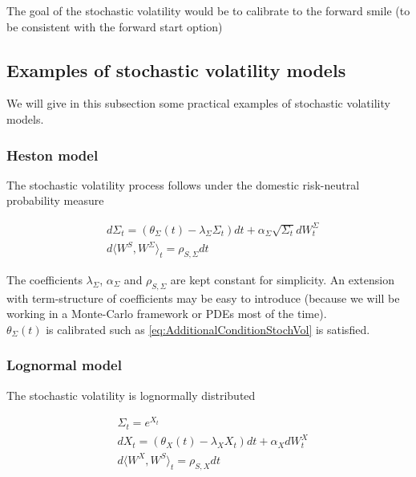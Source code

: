 \documentclass{article}
\begin{document}
\noindent The goal of the stochastic volatility would be to calibrate to the forward smile (to be consistent with the forward start option)

\subsection{Examples of stochastic volatility models}
We will give in this subsection some practical examples of stochastic volatility models.

\subsubsection{Heston model}

The stochastic volatility process follows under the domestic risk-neutral probability measure

\begin{equation}
\begin{aligned}
	&d\Sigma_t = \left(\theta_\Sigma(t) - \lambda_\Sigma \Sigma_t\right) dt + \alpha_\Sigma \sqrt{\Sigma_t}dW_t^\Sigma\\
	&d\langle W^S, W^\Sigma \rangle_t = \rho_{S,\Sigma} dt
\end{aligned}
\end{equation}

\noindent The coefficients $\lambda_\Sigma$, $\alpha_\Sigma$ and $\rho_{S,\Sigma}$ are kept constant for simplicity. An extension with term-structure of coefficients may be easy to introduce (because we will be working in a Monte-Carlo framework or PDEs most of the time).\\

\noindent $\theta_\Sigma(t)$ is calibrated such as \ref{eq:AdditionalConditionStochVol} is satisfied.

\subsubsection{Lognormal model}

The stochastic volatility is lognormally distributed

\begin{equation}
	\begin{aligned}
		&\Sigma_t = e^{X_t}\\
		&dX_t = \left(\theta_X(t) - \lambda_X X_t\right) dt + \alpha_X dW_t^X\\
		&d\langle W^X, W^S\rangle_t = \rho_{S,X} dt
	\end{aligned}
\end{equation}
\end{document}
